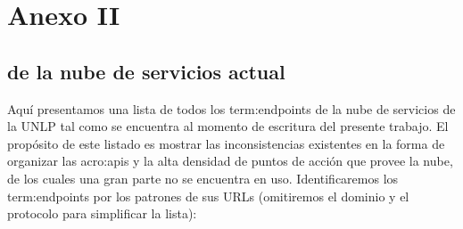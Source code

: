 \section{Anexo II}
\label{anexo:endpoints-nube-actual}

\subsection{ de la nube de servicios actual}

Aquí presentamos una lista de todos los \glspl{term:endpoint} de la nube de servicios de la UNLP tal como se encuentra al momento de escritura del presente trabajo. El propósito de este listado es mostrar las inconsistencias existentes en la forma de organizar las \glspl{acro:api} y la alta densidad de puntos de acción que provee la nube, de los cuales una gran parte no se encuentra en uso. Identificaremos los \glspl{term:endpoint} por los patrones de sus URLs (omitiremos el dominio y el protocolo para simplificar la lista):

